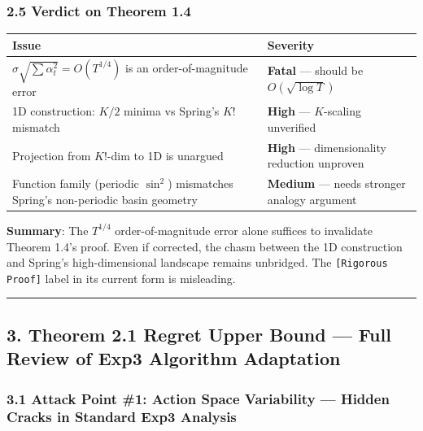 \documentclass[
  12pt,
]{article}
\begin{document}
\subsubsection{2.5 Verdict on Theorem 1.4}\label{verdict-thm-1.4}

\begin{longtable}[]{@{}
  >{\raggedright\arraybackslash}p{}
  >{\raggedright\arraybackslash}p{}@{}}
\toprule\noalign{}
\begin{minipage}[b]{\linewidth}\raggedright
Issue
\end{minipage} & \begin{minipage}[b]{\linewidth}\raggedright
Severity
\end{minipage} \\
\midrule\noalign{}
\endhead
\bottomrule\noalign{}
\endlastfoot
$\sigma\sqrt{\sum\alpha_t^2} = O(T^{1/4})$ is an order-of-magnitude error & \textbf{Fatal} --- should be $O(\sqrt{\log T})$ \\
1D construction: $K/2$ minima vs Spring's $K!$ mismatch & \textbf{High} --- $K$-scaling unverified \\
Projection from $K!$-dim to 1D is unargued & \textbf{High} --- dimensionality reduction unproven \\
Function family (periodic $\sin^2$) mismatches Spring's non-periodic basin geometry & \textbf{Medium} --- needs stronger analogy argument \\
\end{longtable}

\textbf{Summary}: The $T^{1/4}$ order-of-magnitude error alone suffices to invalidate Theorem 1.4's proof. Even if corrected, the chasm between the 1D construction and Spring's high-dimensional landscape remains unbridged. The \texttt{[Rigorous Proof]} label in its current form is misleading.

\begin{center}\rule{0.5\linewidth}{0.5pt}\end{center}

\subsection{3. Theorem 2.1 Regret Upper Bound --- Full Review of Exp3 Algorithm Adaptation}\label{attack-thm-2.1}

\subsubsection{3.1 Attack Point \#1: Action Space Variability --- Hidden Cracks in Standard Exp3 Analysis}\label{attack-1-action-space}
\end{document}
